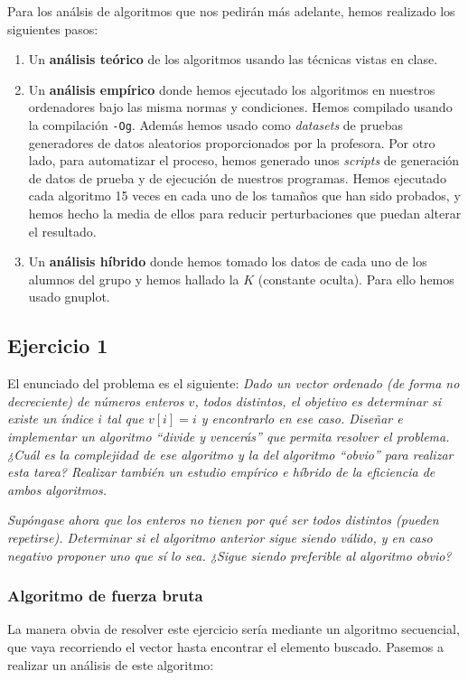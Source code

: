 \documentclass[10pt,a4paper]{article}
\begin{document}
Para los análsis de algoritmos que nos pedirán más adelante, hemos realizado los siguientes pasos:
\begin{enumerate}
	\item Un \textbf{análisis teórico} de los algoritmos usando las técnicas vistas en clase.
	\item Un \textbf{análisis empírico} donde hemos ejecutado los algoritmos en nuestros ordenadores bajo las misma normas y condiciones. Hemos compilado usando la compilación  \texttt{-Og}. Además hemos usado como \textit{datasets} de pruebas generadores de datos aleatorios proporcionados por la profesora. Por otro lado, para automatizar el proceso, hemos generado unos \textit{scripts} de generación de datos de prueba y de ejecución de nuestros programas. Hemos ejecutado cada algoritmo 15 veces en cada uno de los tamaños que han sido probados, y hemos hecho la media de ellos para reducir perturbaciones que puedan alterar el resultado.
	\item Un \textbf{análisis híbrido} donde hemos tomado los datos de cada uno de los alumnos del grupo y hemos hallado la \(K\) (constante oculta). Para ello hemos usado gnuplot.
\end{enumerate}

\subsection{Ejercicio 1}
El enunciado del problema es el siguiente: \textit{Dado un vector ordenado (de forma no decreciente) de números enteros \(v\), todos distintos, el objetivo es determinar si existe un índice \(i\) tal que \(v[i] = i\) y encontrarlo en ese caso. Diseñar e implementar un algoritmo ``divide y vencerás'' que permita resolver el problema. ¿Cuál es la complejidad de ese algoritmo y la del algoritmo ``obvio'' para realizar esta tarea? Realizar también un estudio empírico e híbrido de la eficiencia de ambos algoritmos.}

\textit{Supóngase ahora que los enteros no tienen por qué ser todos distintos (pueden repetirse). Determinar si el algoritmo anterior sigue siendo válido, y en caso negativo proponer uno que sí lo sea. ¿Sigue siendo preferible al algoritmo obvio?}

\subsubsection{Algoritmo de fuerza bruta}
La manera obvia de resolver este ejercicio sería mediante un algoritmo secuencial, que vaya recorriendo el vector hasta encontrar el elemento buscado. Pasemos a realizar un análisis de este algoritmo:
\end{document}
